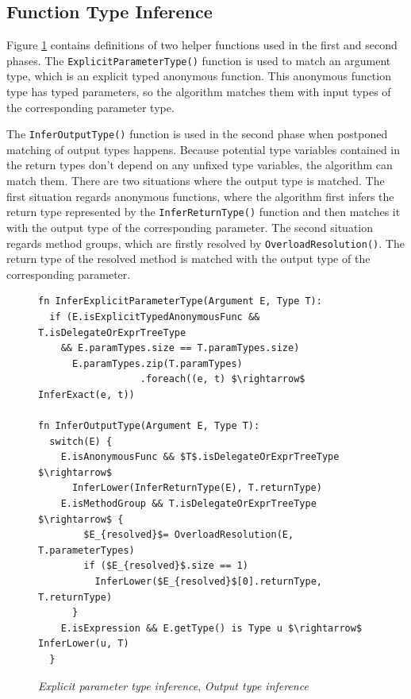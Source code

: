 \subsection{Function Type Inference} \label{sect:FuncTI}

Figure \ref{img11:methodTypeInference2} contains definitions of two helper functions used in the first and second phases. 
The \texttt{ExplicitParameterType()} function is used to match an argument type, which is an explicit typed anonymous function. 
This anonymous function type has typed parameters, so the algorithm matches them with input types of the corresponding parameter type.
\par
The \texttt{InferOutputType()} function is used in the second phase when postponed
matching of output types happens. 
Because potential type variables contained in the return types don’t depend on any unfixed type variables, the algorithm can match them. 
There are two situations where the output type is matched. 
The first situation regards anonymous functions, where the algorithm first infers the return type represented by the \texttt{InferReturnType()} function and then matches it with the output type of the corresponding parameter. 
The second situation regards method groups, which are firstly resolved by \texttt{OverloadResolution()}. 
The return type of the resolved method is matched with the output type of the corresponding parameter.
\begin{figure}[h!]
\begin{lstlisting}[style=myAlgo, mathescape=true]
fn InferExplicitParameterType(Argument E, Type T):
  if (E.isExplicitTypedAnonymousFunc && T.isDelegateOrExprTreeType
    && E.paramTypes.size == T.paramTypes.size)
      E.paramTypes.zip(T.paramTypes)
                  .foreach((e, t) $\rightarrow$ InferExact(e, t))

fn InferOutputType(Argument E, Type T):
  switch(E) {
	E.isAnonymousFunc && $T$.isDelegateOrExprTreeType $\rightarrow$
	  InferLower(InferReturnType(E), T.returnType) 
	E.isMethodGroup && T.isDelegateOrExprTreeType $\rightarrow$ {
	  	$E_{resolved}$= OverloadResolution(E, T.parameterTypes)
	  	if ($E_{resolved}$.size == 1) 
	  	  InferLower($E_{resolved}$[0].returnType, T.returnType) 
	  }
	E.isExpression && E.getType() is Type u $\rightarrow$ InferLower(u, T)
  }
\end{lstlisting}
\caption{\textit{Explicit parameter type inference}, \textit{Output type inference}}
\label{img11:methodTypeInference2}
\end{figure}
\newpage

